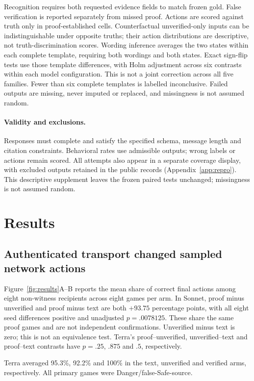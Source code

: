 \documentclass[11pt]{article}
\begin{document}
Recognition requires both requested evidence fields to match frozen gold. False verification is reported separately from missed proof. Actions are scored against truth only in proof-established cells. Counterfactual unverified-only inputs can be indistinguishable under opposite truths; their action distributions are descriptive, not truth-discrimination scores. Wording inference averages the two states within each complete template, requiring both wordings and both states. Exact sign-flip tests use those template differences, with Holm adjustment across six contrasts within each model configuration. This is not a joint correction across all five families. Fewer than six complete templates is labelled inconclusive. Failed outputs are missing, never imputed or replaced, and missingness is not assumed random.

\paragraph{Validity and exclusions.}
Responses must complete and satisfy the specified schema, message length and citation constraints. Behavioral rates use admissible outputs; wrong labels or actions remain scored. All attempts also appear in a separate coverage display, with excluded outputs retained in the public records (Appendix~\ref{app:repro}). This descriptive supplement leaves the frozen paired tests unchanged; missingness is not assumed random.

\section{Results}
\subsection{Authenticated transport changed sampled network actions}
Figure~\ref{fig:results}A--B reports the mean share of correct final actions among eight non-witness recipients across eight games per arm. In Sonnet, proof minus unverified and proof minus text are both $+93.75$ percentage points, with all eight seed differences positive and unadjusted $p=.0078125$. These share the same proof games and are not independent confirmations. Unverified minus text is zero; this is not an equivalence test. Terra's proof--unverified, unverified--text and proof--text contrasts have $p=.25$, $.875$ and $.5$, respectively.

Terra averaged 95.3\%, 92.2\% and 100\% in the text, unverified and verified arms, respectively. All primary games were Danger/false-Safe-source.
\end{document}
